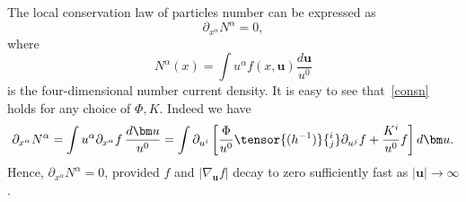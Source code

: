 \documentclass[12pt]{article}
\theoremstyle{definition}
\numberwithin{equation}{section}
\begin{document}
The local conservation law of particles number can be expressed as
\begin{equation}\label{consn}
\partial_{x^\alpha}N^\alpha=0,
\end{equation}
where
\begin{equation}\label{N}
N^\alpha(x) =\int u^\alpha f(x,{\bm u})\frac{d{\bm u}}{u^0}
\end{equation}
is the four-dimensional number current density. It is easy to see that~\eqref{consn} holds for any choice of $\Phi,K$. Indeed we have
\[
\partial_{x^\alpha}N^\alpha
=\int u^\alpha \partial_{x^\alpha} f\,\frac{d{\bm u}}{u^0}=\int \partial_{u^i}\left[\frac{\Phi}{u^0}\tensor{(h^{-1})}{^i_j}\partial_{u^j}f+\frac{K^i}{u^0}f\right]d{\bm u}.
\]
Hence, $\partial_{x^\alpha}N^\alpha=0$, provided $f$ and $|\nabla_{{\bm u}}f|$ decay to zero sufficiently fast as $|{\bm u}|\to\infty$.
\end{document}
